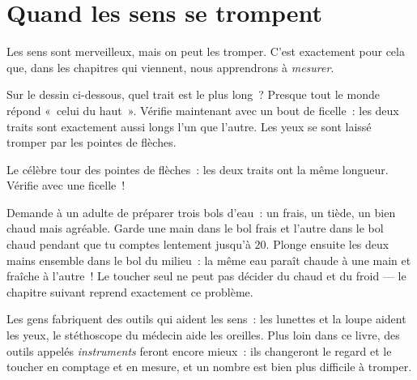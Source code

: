 \section{Quand les sens se trompent}

Les sens sont merveilleux, mais on peut les tromper. C'est
exactement pour cela que, dans les chapitres qui viennent, nous
apprendrons à \emph{mesurer}.

\begin{example}\label{ex:g1:five-senses:lines}
Sur le dessin ci-dessous, quel trait est le plus long~? Presque tout
le monde répond «~celui du haut~». Vérifie maintenant avec un bout de
ficelle~: les deux traits sont exactement aussi longs l'un que
l'autre. Les yeux se sont laissé tromper par les pointes de flèches.
\end{example}

\begin{omfigure}

{\small Le célèbre tour des pointes de flèches~: les deux traits ont
la même longueur. Vérifie avec une ficelle~!}
\end{omfigure}

\begin{example}\label{ex:g1:five-senses:bowls}
Demande à un adulte de préparer trois bols d'eau~: un frais, un
tiède, un bien chaud mais agréable. Garde une main dans le bol frais
et l'autre dans le bol chaud pendant que tu comptes lentement jusqu'à
$20$. Plonge ensuite les deux mains ensemble dans le bol du milieu~:
la même eau paraît chaude à une main et fraîche à l'autre~! Le
toucher seul ne peut pas décider du chaud et du froid --- le chapitre
suivant reprend exactement ce problème.
\end{example}

\begin{remark}\label{rem:g1:five-senses:tools}
Les gens fabriquent des outils qui aident les sens~: les lunettes et
la loupe aident les yeux, le stéthoscope du médecin aide les
oreilles. Plus loin dans ce livre, des outils appelés
\emph{instruments} feront encore mieux~: ils changeront le regard et
le toucher en comptage et en mesure, et un nombre est bien plus
difficile à tromper.
\end{remark}

